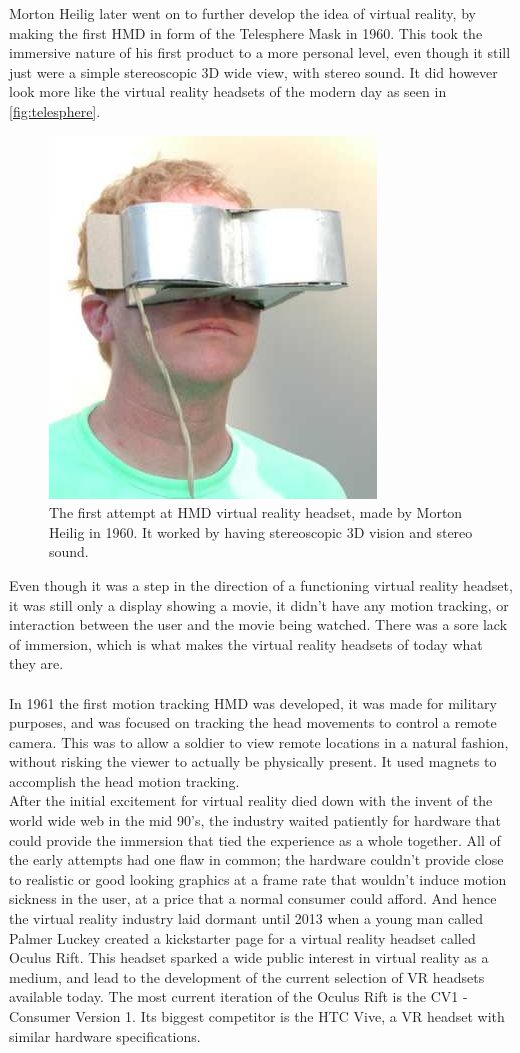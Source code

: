 		Morton Heilig later went on to further develop the idea of virtual reality, by making the first HMD in form of the Telesphere Mask\cite{VRS} in 1960. This took the immersive nature of his first product to a more personal level, even though it still just were a simple stereoscopic 3D wide view, with stereo sound. It did however look more like the virtual reality headsets of the modern day as seen in \autoref{fig:telesphere}.
		\begin{figure}[H]
			\centering
			\includegraphics[width=0.25\linewidth]{figure/Analysis/TelesphereMask}
			\caption{The first attempt at HMD virtual reality headset, made by Morton Heilig in 1960. It worked by having stereoscopic 3D vision and stereo sound.}
			\label{fig:telesphere}
		\end{figure}
		Even though it was a step in the direction of a functioning virtual reality headset, it was still only a display showing a movie, it didn't have any motion tracking, or interaction between the user and the movie being watched. There was a sore lack of immersion, which is what makes the virtual reality headsets of today what they are.\\\\
		
		In 1961 the first motion tracking HMD was developed\cite{VRS}, it was made for military purposes, and was focused on tracking the head movements to control a remote camera. This was to allow a soldier to view remote locations in a natural fashion, without risking the viewer to actually be physically present. It used magnets to accomplish the head motion tracking.\\
		
	
	
	After the initial excitement for virtual reality died down with the invent of the world wide web in the mid 90's, the industry waited patiently for hardware that could provide the immersion that tied the experience as a whole together. All of the early attempts had one flaw in common; the hardware couldn't provide close to realistic or good looking graphics at a frame rate that wouldn't induce motion sickness in the user, at a price that a normal consumer could afford\cite{vergeVR}. And hence the virtual reality industry laid dormant until 2013 when a young man called Palmer Luckey created a kickstarter page for a virtual reality headset called Oculus Rift\cite{createOculus}. This headset sparked a wide public interest in virtual reality as a medium, and lead to the development of the current selection of VR headsets available today. The most current iteration of the Oculus Rift is the CV1 - Consumer Version 1. Its biggest competitor is the HTC Vive, a VR headset with similar hardware specifications. 
	
